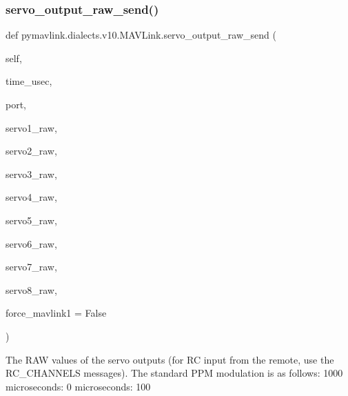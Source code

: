 \begin{DoxyVerb}
\begin{DoxyVerb}
\begin{DoxyVerb}
\begin{DoxyVerb}
\begin{DoxyVerb}
\begin{DoxyVerb}
\begin{DoxyVerb}
\begin{DoxyVerb}
\begin{DoxyVerb}
\begin{DoxyVerb}
\subsubsection{\texorpdfstring{servo\+\_\+output\+\_\+raw\+\_\+send()}{servo\_output\_raw\_send()}}
{\footnotesize\ttfamily def pymavlink.\+dialects.\+v10.\+M\+A\+V\+Link.\+servo\+\_\+output\+\_\+raw\+\_\+send (\begin{DoxyParamCaption}\item[{}]{self,  }\item[{}]{time\+\_\+usec,  }\item[{}]{port,  }\item[{}]{servo1\+\_\+raw,  }\item[{}]{servo2\+\_\+raw,  }\item[{}]{servo3\+\_\+raw,  }\item[{}]{servo4\+\_\+raw,  }\item[{}]{servo5\+\_\+raw,  }\item[{}]{servo6\+\_\+raw,  }\item[{}]{servo7\+\_\+raw,  }\item[{}]{servo8\+\_\+raw,  }\item[{}]{force\+\_\+mavlink1 = {\ttfamily False} }\end{DoxyParamCaption})}

\begin{DoxyVerb}The RAW values of the servo outputs (for RC input from the remote, use
the RC_CHANNELS messages). The standard PPM modulation
is as follows: 1000 microseconds: 0%
microseconds: 100%


\end{DoxyVerb}
\end{DoxyVerb}
\end{DoxyVerb}
\end{DoxyVerb}
\end{DoxyVerb}
\end{DoxyVerb}
\end{DoxyVerb}
\end{DoxyVerb}
\end{DoxyVerb}
\end{DoxyVerb}
\end{DoxyVerb}
